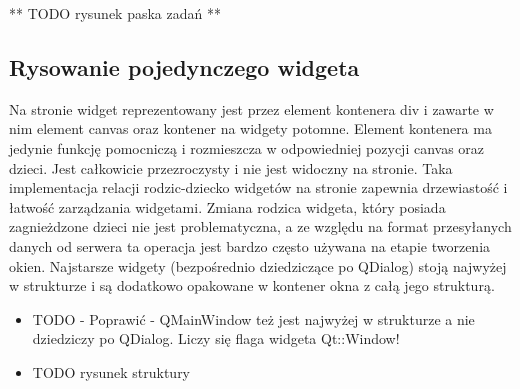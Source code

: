 ** TODO rysunek paska zadań **

\subsection{Rysowanie pojedynczego widgeta}
Na stronie widget reprezentowany jest przez element kontenera div i zawarte w nim element canvas oraz kontener na widgety potomne. Element kontenera ma jedynie funkcję pomocniczą i rozmieszcza w odpowiedniej pozycji canvas oraz dzieci. Jest całkowicie przezroczysty i nie jest widoczny na stronie. Taka implementacja relacji rodzic-dziecko widgetów na stronie zapewnia drzewiastość i łatwość zarządzania widgetami. Zmiana rodzica widgeta, który posiada zagnieżdzone dzieci nie jest problematyczna, a ze względu na format przesyłanych danych od serwera ta operacja jest bardzo często używana na etapie tworzenia okien. Najstarsze widgety (bezpośrednio dziedziczące po QDialog) stoją najwyżej w strukturze i są dodatkowo opakowane w kontener okna z całą jego strukturą.

\begin{itemize}
\item TODO - Poprawić - QMainWindow też jest najwyżej w strukturze a nie dziedziczy po QDialog. Liczy się flaga widgeta Qt::Window!
\item TODO rysunek struktury
\end{itemize}
